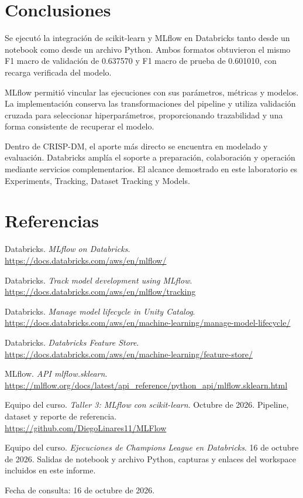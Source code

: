 \documentclass[12pt,a4paper]{article}
\begin{document}
\newpage
\section{Conclusiones}
Se ejecutó la integración de scikit-learn y MLflow en Databricks tanto desde un notebook como desde un archivo Python. Ambos formatos obtuvieron el mismo F1 macro de validación de 0.637570 y F1 macro de prueba de 0.601010, con recarga verificada del modelo.

MLflow permitió vincular las ejecuciones con sus parámetros, métricas y modelos. La implementación conserva las transformaciones del pipeline y utiliza validación cruzada para seleccionar hiperparámetros, proporcionando trazabilidad y una forma consistente de recuperar el modelo.

Dentro de CRISP-DM, el aporte más directo se encuentra en modelado y evaluación. Databricks amplía el soporte a preparación, colaboración y operación mediante servicios complementarios. El alcance demostrado en este laboratorio es Experiments, Tracking, Dataset Tracking y Models.

\section{Referencias}
\small
\begin{enumerate}[label={[\arabic*]},itemsep=3pt]
\item Databricks. \textit{MLflow on Databricks}.\\\url{https://docs.databricks.com/aws/en/mlflow/}
\item Databricks. \textit{Track model development using MLflow}.\\\url{https://docs.databricks.com/aws/en/mlflow/tracking}
\item Databricks. \textit{Manage model lifecycle in Unity Catalog}.\\\url{https://docs.databricks.com/aws/en/machine-learning/manage-model-lifecycle/}
\item Databricks. \textit{Databricks Feature Store}.\\\url{https://docs.databricks.com/aws/en/machine-learning/feature-store/}
\item MLflow. \textit{API mlflow.sklearn}.\\\url{https://mlflow.org/docs/latest/api_reference/python_api/mlflow.sklearn.html}
\item Equipo del curso. \textit{Taller 3: MLflow con scikit-learn}. Octubre de 2026. Pipeline, dataset y reporte de referencia.\\\url{https://github.com/DiegoLinares11/MLFlow}
\item Equipo del curso. \textit{Ejecuciones de Champions League en Databricks}. 16 de octubre de 2026. Salidas de notebook y archivo Python, capturas y enlaces del workspace incluidos en este informe.
\end{enumerate}
\noindent Fecha de consulta: 16 de octubre de 2026.
\end{document}

